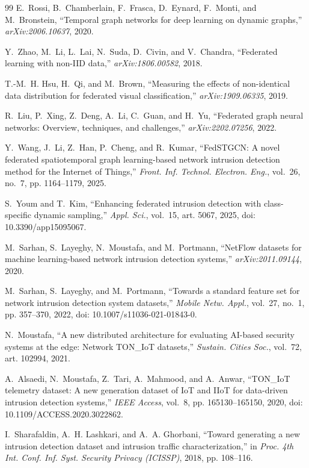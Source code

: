 \documentclass[journal]{IEEEtran}
\begin{document}
\begin{thebibliography}{99}
E.~Rossi, B.~Chamberlain, F.~Frasca, D.~Eynard, F.~Monti, and M.~Bronstein, ``Temporal graph networks for deep learning on dynamic graphs,'' \emph{arXiv:2006.10637}, 2020.

Y.~Zhao, M.~Li, L.~Lai, N.~Suda, D.~Civin, and V.~Chandra, ``Federated learning with non-IID data,'' \emph{arXiv:1806.00582}, 2018.

T.-M.~H. Hsu, H.~Qi, and M.~Brown, ``Measuring the effects of non-identical data distribution for federated visual classification,'' \emph{arXiv:1909.06335}, 2019.

R.~Liu, P.~Xing, Z.~Deng, A.~Li, C.~Guan, and H.~Yu, ``Federated graph neural networks: Overview, techniques, and challenges,'' \emph{arXiv:2202.07256}, 2022.

Y.~Wang, J.~Li, Z.~Han, P.~Cheng, and R.~Kumar, ``FedSTGCN: A novel federated spatiotemporal graph learning-based network intrusion detection method for the Internet of Things,'' \emph{Front. Inf. Technol. Electron. Eng.}, vol.~26, no.~7, pp. 1164--1179, 2025.

S.~Youm and T.~Kim, ``Enhancing federated intrusion detection with class-specific dynamic sampling,'' \emph{Appl. Sci.}, vol.~15, art. 5067, 2025, doi: 10.3390/app15095067.

M.~Sarhan, S.~Layeghy, N.~Moustafa, and M.~Portmann, ``NetFlow datasets for machine learning-based network intrusion detection systems,'' \emph{arXiv:2011.09144}, 2020.

M.~Sarhan, S.~Layeghy, and M.~Portmann, ``Towards a standard feature set for network intrusion detection system datasets,'' \emph{Mobile Netw. Appl.}, vol.~27, no.~1, pp. 357--370, 2022, doi: 10.1007/s11036-021-01843-0.

N.~Moustafa, ``A new distributed architecture for evaluating AI-based security systems at the edge: Network TON\_IoT datasets,'' \emph{Sustain. Cities Soc.}, vol.~72, art. 102994, 2021.

A.~Alsaedi, N.~Moustafa, Z.~Tari, A.~Mahmood, and A.~Anwar, ``TON\_IoT telemetry dataset: A new generation dataset of IoT and IIoT for data-driven intrusion detection systems,'' \emph{IEEE Access}, vol.~8, pp. 165130--165150, 2020, doi: 10.1109/ACCESS.2020.3022862.

I.~Sharafaldin, A.~H. Lashkari, and A.~A. Ghorbani, ``Toward generating a new intrusion detection dataset and intrusion traffic characterization,'' in \emph{Proc. 4th Int. Conf. Inf. Syst. Security Privacy (ICISSP)}, 2018, pp. 108--116.


\end{thebibliography}
\end{document}
